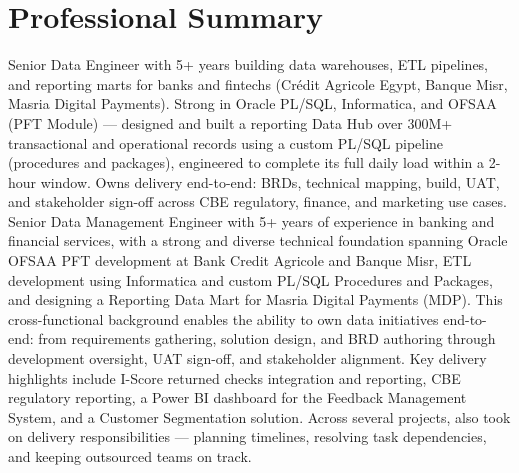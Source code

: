 \section{Professional Summary}

{\small\textcolor{darktext}{%
Senior Data Engineer with 5+ years building data warehouses, ETL pipelines, 
and reporting marts for banks and fintechs (Crédit Agricole Egypt, Banque Misr, Masria Digital Payments). 
Strong in Oracle PL/SQL, Informatica, and OFSAA (PFT Module) — designed and built a reporting Data Hub over 300M+ transactional and operational records using a custom PL/SQL pipeline (procedures and packages), engineered to complete its full daily load within a 2-hour window. Owns delivery end-to-end: BRDs, technical mapping, build, UAT, and stakeholder sign-off across CBE regulatory, finance, and marketing use cases.
Senior Data Management Engineer with 5+ years of experience in banking and financial services, with a strong and diverse technical foundation spanning Oracle OFSAA PFT development at Bank Credit Agricole and Banque Misr, 
ETL development using Informatica and custom PL/SQL Procedures and Packages, and designing a Reporting Data Mart for Masria Digital Payments (MDP). 
This cross-functional background enables the ability to own data initiatives end-to-end: from requirements gathering, solution design, and BRD authoring through development oversight, UAT sign-off, and stakeholder alignment. 
Key delivery highlights include I-Score returned checks integration and reporting, CBE regulatory reporting, a Power BI dashboard for the Feedback Management System, and a Customer Segmentation solution. 
Across several projects, also took on delivery responsibilities — planning timelines, resolving task dependencies, and keeping outsourced teams on track.}}

